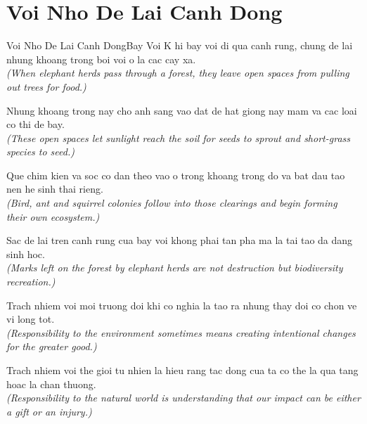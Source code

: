\section{Voi Nho De Lai Canh Dong}
\begin{truyen}{Voi Nho De Lai Canh Dong}{Bay Voi}
K hi bay voi di qua canh rung, chung de lai nhung khoang trong boi voi o la cac cay xa.\\
\textit{(When elephant herds pass through a forest, they leave open spaces from pulling out trees for food.)}

Nhung khoang trong nay cho anh sang vao dat de hat giong nay mam va cac loai co thi de bay.\\
\textit{(These open spaces let sunlight reach the soil for seeds to sprout and short-grass species to seed.)}

Que chim kien va soc co dan theo vao o trong khoang trong do va bat dau tao nen he sinh thai rieng.\\
\textit{(Bird, ant and squirrel colonies follow into those clearings and begin forming their own ecosystem.)}

Sac de lai tren canh rung cua bay voi khong phai tan pha ma la tai tao da dang sinh hoc.\\
\textit{(Marks left on the forest by elephant herds are not destruction but biodiversity recreation.)}

Trach nhiem voi moi truong doi khi co nghia la tao ra nhung thay doi co chon ve vi long tot.\\
\textit{(Responsibility to the environment sometimes means creating intentional changes for the greater good.)}

\end{truyen}
\begin{baihoc}
  Trach nhiem voi the gioi tu nhien la hieu rang tac dong cua ta co the la qua tang hoac la chan thuong.\\
  \textit{(Responsibility to the natural world is understanding that our impact can be either a gift or an injury.)}
\end{baihoc}

